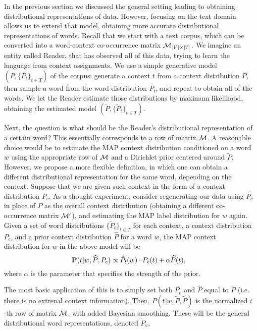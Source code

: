 In the previous section we discussed the general setting leading to
obtaining distributional representations of data. However, focusing on
the text domain allows us to extend that model, obtaining more
accurate distributional representations of words. Recall that we start
with a text corpus, which can be converted into a word-context
co-occurrence matrix ${\mathcal M}_{|V|\times|T|}$. 
We imagine an entity
called Reader, that has observed all of this data, trying to learn the
language from context assignments.
We use a simple generative model $(P,\{P_t\}_{t\in T})$ of the corpus: 
generate a context $t$ from a context distribution $P$, then sample a
word from the word distribution $P_t$,
and repeat to obtain all of the words. We let the Reader estimate
those distributions by maximum likelihood, obtaining the estimated
model $(\tilde{P},\{\tilde{P}_t\}_{t\in T})$.

Next, the question is what should be  
the Reader's distributional representation of a certain word? This
essentially corresponds to a row of matrix ${\mathcal M}$. A reasonable choice
would be to estimate the MAP context distribution conditioned on a word
$w$ using the appropriate row of ${\mathcal M}$ and a Dirichlet prior centered
around $\tilde{P}$. However, we propose
a more flexible definition, in which one can obtain a different
distributional representation for the same word, depending on the
context. Suppose that we are given such context in the form of a context
distribution $P_c$. As a thought experiment, consider regenerating our
data using $P_c$ in place of $P$ as the overall context
distribution (obtaining a different co-occurrence matrix ${\mathcal M}'$), and
estimating the MAP label distribution for $w$ again.
\bep\label{map}
Given a set of word distributions $\{\tilde{P}_t\}_{t\in T}$ for each
context, a context
distribution $P_c$, and a prior context distribution $\widehat{P}$ for a word $w$,
the MAP context distribution for $w$ in the above model will be
\[\operatorname{\mathbf{P}}(t|w,\widehat{P},P_c) \propto \tilde{P}_t(w)\cdot P_c(t) + \alpha
\widehat{P}(t),\]
where $\alpha$ is the parameter that specifies the strength of the prior.
\eep

The most basic application of this is to simply set
both $P_c$ and $\widehat{P}$ equal to $\tilde{P}$ (i.e. there is no extrenal context
information). Then, $P(t|w,\tilde{P},\tilde{P})$ is the
normalized $i$-th row of matrix ${\mathcal M}$, with added Bayesian
smoothing. These will be the general distributional word
representations, denoted $\tilde{P}_w$. 

